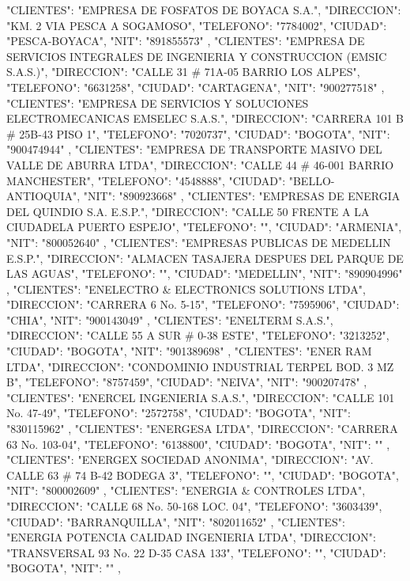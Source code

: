    {
   "CLIENTES": "EMPRESA DE FOSFATOS DE BOYACA S.A.",
   "DIRECCION": "KM. 2 VIA PESCA A SOGAMOSO",
   "TELEFONO": "7784002",
   "CIUDAD": "PESCA-BOYACA",
   "NIT": "891855573"
   },
   {
   "CLIENTES": "EMPRESA DE SERVICIOS INTEGRALES DE INGENIERIA Y CONSTRUCCION (EMSIC S.A.S.)",
   "DIRECCION": "CALLE 31 # 71A-05 BARRIO LOS ALPES",
   "TELEFONO": "6631258",
   "CIUDAD": "CARTAGENA",
   "NIT": "900277518"
   },
   {
   "CLIENTES": "EMPRESA DE SERVICIOS Y SOLUCIONES ELECTROMECANICAS EMSELEC S.A.S.",
   "DIRECCION": "CARRERA 101 B # 25B-43 PISO 1",
   "TELEFONO": "7020737",
   "CIUDAD": "BOGOTA",
   "NIT": "900474944"
   },
   {
   "CLIENTES": "EMPRESA DE TRANSPORTE MASIVO DEL VALLE DE ABURRA LTDA",
   "DIRECCION": "CALLE 44 # 46-001 BARRIO MANCHESTER",
   "TELEFONO": "4548888",
   "CIUDAD": "BELLO-ANTIOQUIA",
   "NIT": "890923668"
   },
   {
   "CLIENTES": "EMPRESAS DE ENERGIA DEL QUINDIO S.A. E.S.P.",
   "DIRECCION": "CALLE 50 FRENTE A LA CIUDADELA PUERTO ESPEJO",
   "TELEFONO": "",
   "CIUDAD": "ARMENIA",
   "NIT": "800052640"
   },
   {
   "CLIENTES": "EMPRESAS PUBLICAS DE MEDELLIN E.S.P.",
   "DIRECCION": "ALMACEN TASAJERA DESPUES DEL PARQUE DE LAS AGUAS",
   "TELEFONO": "",
   "CIUDAD": "MEDELLIN",
   "NIT": "890904996"
   },
   {
   "CLIENTES": "ENELECTRO & ELECTRONICS SOLUTIONS LTDA",
   "DIRECCION": "CARRERA 6 No. 5-15",
   "TELEFONO": "7595906",
   "CIUDAD": "CHIA",
   "NIT": "900143049"
   },
   {
   "CLIENTES": "ENELTERM S.A.S.",
   "DIRECCION": "CALLE 55 A SUR # 0-38 ESTE",
   "TELEFONO": "3213252",
   "CIUDAD": "BOGOTA",
   "NIT": "901389698"
   },
   {
   "CLIENTES": "ENER RAM LTDA",
   "DIRECCION": "CONDOMINIO INDUSTRIAL TERPEL BOD. 3 MZ B",
   "TELEFONO": "8757459",
   "CIUDAD": "NEIVA",
   "NIT": "900207478"
   },
   {
   "CLIENTES": "ENERCEL INGENIERIA S.A.S.",
   "DIRECCION": "CALLE 101 No. 47-49",
   "TELEFONO": "2572758",
   "CIUDAD": "BOGOTA",
   "NIT": "830115962"
   },
   {
   "CLIENTES": "ENERGESA LTDA",
   "DIRECCION": "CARRERA 63 No. 103-04",
   "TELEFONO": "6138800",
   "CIUDAD": "BOGOTA",
   "NIT": ""
   },
   {
   "CLIENTES": "ENERGEX SOCIEDAD ANONIMA",
   "DIRECCION": "AV. CALLE 63 # 74 B-42 BODEGA 3",
   "TELEFONO": "",
   "CIUDAD": "BOGOTA",
   "NIT": "800002609"
   },
   {
   "CLIENTES": "ENERGIA & CONTROLES LTDA",
   "DIRECCION": "CALLE 68 No. 50-168 LOC. 04",
   "TELEFONO": "3603439",
   "CIUDAD": "BARRANQUILLA",
   "NIT": "802011652"
   },
   {
   "CLIENTES": "ENERGIA POTENCIA CALIDAD INGENIERIA LTDA",
   "DIRECCION": "TRANSVERSAL 93 No. 22 D-35 CASA 133",
   "TELEFONO": "",
   "CIUDAD": "BOGOTA",
   "NIT": ""
   },
